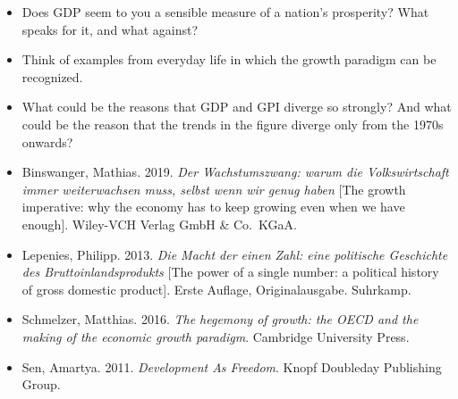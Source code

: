 \documentclass[
  british,
  a4paper,
  DIV=11,
  numbers=noendperiod,
  oneside,
  openany]{scrreprt}
\providecommand{\tightlist}{%
  \setlength{\itemsep}{0pt}\setlength{\parskip}{0pt}}
\begin{document}
\begin{tcolorbox}[enhanced jigsaw, arc=.35mm, bottomrule=.15mm, bottomtitle=1mm, breakable, colback=white, colbacktitle=quarto-callout-caution-color!10!white, colframe=quarto-callout-caution-color-frame, coltitle=black, left=2mm, leftrule=.75mm, opacityback=0, opacitybacktitle=0.6, rightrule=.15mm, title={In-depth questions}, titlerule=0mm, toprule=.15mm, toptitle=1mm]

\begin{itemize}
\tightlist
\item
  Does GDP seem to you a sensible measure of a nation's prosperity? What
  speaks for it, and what against?
\item
  Think of examples from everyday life in which the growth paradigm can
  be recognized.
\item
  What could be the reasons that GDP and GPI diverge so strongly? And
  what could be the reason that the trends in the figure diverge only
  from the 1970s onwards?
\end{itemize}

\end{tcolorbox}

\begin{tcolorbox}[enhanced jigsaw, arc=.35mm, bottomrule=.15mm, bottomtitle=1mm, breakable, colback=white, colbacktitle=quarto-callout-note-color!10!white, colframe=quarto-callout-note-color-frame, coltitle=black, left=2mm, leftrule=.75mm, opacityback=0, opacitybacktitle=0.6, rightrule=.15mm, title={Further reading}, titlerule=0mm, toprule=.15mm, toptitle=1mm]

\begin{itemize}
\tightlist
\item
  Binswanger, Mathias. 2019. \emph{Der Wachstumszwang: warum die
  Volkswirtschaft immer weiterwachsen muss, selbst wenn wir genug haben}
  {[}The growth imperative: why the economy has to keep growing even
  when we have enough{]}. Wiley-VCH Verlag GmbH \& Co.~KGaA.
\item
  Lepenies, Philipp. 2013. \emph{Die Macht der einen Zahl: eine
  politische Geschichte des Bruttoinlandsprodukts} {[}The power of a
  single number: a political history of gross domestic product{]}. Erste
  Auflage, Originalausgabe. Suhrkamp.
\item
  Schmelzer, Matthias. 2016. \emph{The hegemony of growth: the OECD and
  the making of the economic growth paradigm}. Cambridge University
  Press.
\item
  Sen, Amartya. 2011. \emph{Development As Freedom}. Knopf Doubleday
  Publishing Group.
\end{itemize}

\end{tcolorbox}
\end{document}
